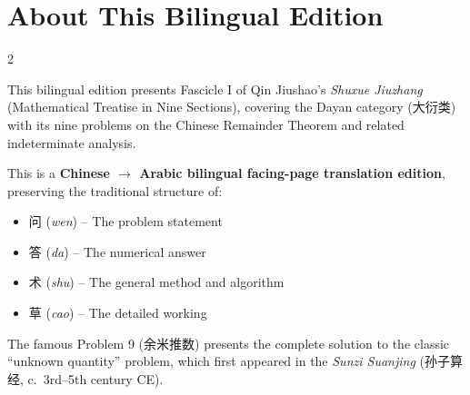 \documentclass[11pt,a4paper]{article}
\newcommand{\zhtext}[1]{{\chinese #1}}
\newenvironment{bilingual}{%
  \begin{paracol}{2}
}{%
  \end{paracol}
}
\begin{document}
\newpage

\section*{About This Bilingual Edition}

\begin{bilingual}

\begin{leftcolumn*}
This bilingual edition presents Fascicle I of Qin Jiushao's \textit{Shuxue Jiuzhang} (Mathematical Treatise in Nine Sections), covering the Dayan category (\zhtext{大衍类}) with its nine problems on the Chinese Remainder Theorem and related indeterminate analysis.

This is a \textbf{Chinese $\rightarrow$ Arabic bilingual facing-page translation edition}, preserving the traditional structure of:
\begin{itemize}
  \item \zhtext{问} (\textit{wen}) -- The problem statement
  \item \zhtext{答} (\textit{da}) -- The numerical answer
  \item \zhtext{术} (\textit{shu}) -- The general method and algorithm
  \item \zhtext{草} (\textit{cao}) -- The detailed working
\end{itemize}

The famous Problem 9 (\zhtext{余米推数}) presents the complete solution to the classic ``unknown quantity'' problem, which first appeared in the \textit{Sunzi Suanjing} (\zhtext{孙子算经}, c.~3rd--5th century CE).


\end{leftcolumn*}
\end{bilingual}
\end{document}
